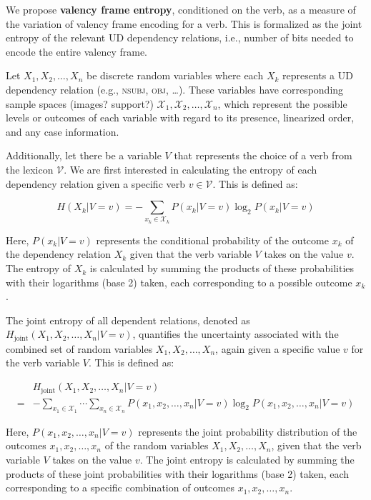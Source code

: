 We propose \textbf{valency frame entropy}, conditioned on the verb, as a measure of the variation of valency frame encoding for a verb. This is formalized as the joint entropy of the relevant UD dependency relations, i.e., number of bits needed to encode the entire valency frame.

Let $X_1, X_2,\ldots,X_n$ be discrete random variables where each $X_k$ represents a UD dependency relation (e.g., \textsc{nsubj}, \textsc{obj}, \ldots). These variables have corresponding sample spaces (images? support?) $\mathcal{X}_1, \mathcal{X}_2, \ldots, \mathcal{X}_n$, which represent the possible levels or outcomes of each variable with regard to its presence, linearized order, and any case information.

Additionally, let there be a variable $V$ that represents the choice of a verb from the lexicon $\mathcal{V}$. We are first interested in calculating the entropy of each dependency relation given a specific verb $v \in \mathcal{V}$. This is defined as:

\begin{equation*}
  H(X_{k}|V=v)=
  -\sum\limits_{x_{k}\in{}\mathcal{X}_{k}}{P(x_{k}|V=v)\log_{2}{P(x_{k}|V=v)}}  
\end{equation*}

Here, $P(x_k | V = v)$ represents the conditional probability of the outcome $x_k$ of the dependency relation $X_k$ given that the verb variable $V$ takes on the value $v$. The entropy of $X_k$ is calculated by summing the products of these probabilities with their logarithms (base 2) taken, each corresponding to a possible outcome $x_k$.

The joint entropy of all dependent relations, denoted as $H_{\text{joint}}(X_1, X_2, \ldots, X_n | V = v)$, quantifies the uncertainty associated with the combined set of random variables $X_1, X_2, \ldots, X_n$, again given a specific value $v$ for the verb variable $V$. This is defined as:

\begin{equation*}
\begin{split}
 & H_{\text{joint}}(X_1, X_2, \ldots, X_n | V=v) \\
=& -\sum\limits_{x_1\in{}\mathcal{X}_1}\cdots\sum\limits_{x_n\in{}\mathcal{X}_n}{P(x_1, x_2, \ldots,x_{n}|V=v)\log_2P(x_1, x_2, \ldots,x_n|V=v)}
\end{split}
\end{equation*}

Here, $P(x_1, x_2, \ldots, x_n | V = v)$ represents the joint probability distribution of the outcomes $x_1, x_2, \ldots, x_n$ of the random variables $X_1, X_2, \ldots, X_n$, given that the verb variable $V$ takes on the value $v$. The joint entropy is calculated by summing the products of these joint probabilities with their logarithms (base 2) taken, each corresponding to a specific combination of outcomes $x_1, x_2, \ldots, x_n$.

